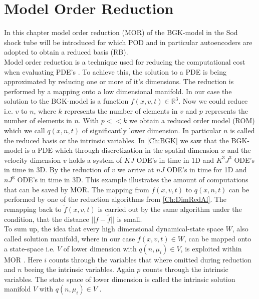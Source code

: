
\chapter{Model Order Reduction}
\label{Ch:ROM}


In this chapter model order reduction (MOR) of the BGK-model in the Sod shock tube will be introduced for which POD and in particular autoencoders are adopted to obtain a reduced basis (RB).\\
Model order reduction is a technique used for reducing the computational cost when evaluating PDE's \cite{Bernard}\cite{Carlberg}\cite{ohlberger2015reduced}. To achieve this, the solution to a PDE is being approximated by reducing one or more of it's dimensions. The reduction is performed by a mapping onto a low dimensional manifold. In our case the solution to the BGK-model is a function \(f(x,v,t) \in \mathbb{R}^3\). Now we could reduce i.e. \(v\) to \(n\), where \(k\) represents the number of elements in \(v\) and \(p\) represents the number of elements in \(n\). With \(p << k\) we obtain a reduced order model (ROM) which we call \(q(x,n,t)\) of significantly lower dimension. In particular \(n\) is called the reduced basis or the intrinsic variables. In \cref{Ch:BGK} we saw that the BGK-model is a PDE which through discretization in the spatial dimension \(x\) and the velocity dimension \(v\) holds a system of \(KJ\) ODE's in time in 1D and \(K^3J^3\) ODE's in time in 3D.  By the reduction of \(v\) we arrive at \(nJ\) ODE's in time for 1D and \(nJ^3\) ODE's in time in 3D. This example illustrates the amount of computations that can be saved by MOR. The mapping from \(f(x,v,t)\) to \(q(x,n,t)\) can be performed by one of the reduction algorithms from \cref{Ch:DimRedAl}. The remapping back to \(\tilde{f}(x,v,t)\) is carried out by the same algorithm under the condition, that the distance \(||f - \tilde{f}||\) is small.\\
To sum up, the idea that every high dimensional dynamical-state space \(W\), also called solution manifold, where in our case \(f(x,v,t) \in W\), can be mapped onto a state-space i.e. \(V\) of lower dimension with \(q(n,\mu_i) \in V\), is exploited within MOR \cite{ohlberger2015reduced}. Here \(i\) counts through the variables that where omitted during reduction and \(n\) beeing the intrinsic variables. Again \(p\) counts through the intrinsic variables. The state space of lower dimension is called the intrinsic solution manifold \(V\) with \(q(n,\mu_i) \in V\) \cite{Carlberg}.\\
